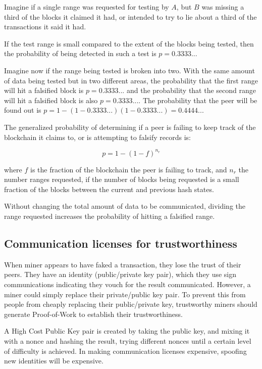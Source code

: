 \documentclass[a4paper,12pt]{article}
\begin{document}
Imagine if a single range was requested for testing by $A$, but $B$ was missing a third of the blocks it claimed it had, or intended to try to lie about a third of the transactions it said it had. 


If the test range is small compared to the extent of the blocks being tested, then the probability of being detected in such a test is $p=0.3333...$

Imagine now if the range being tested is broken into two. With the same amount of data being tested but in two different areas, the probability that the first range will hit a falsified block is $p=0.3333...$ and the probability that the second range will hit a falsified block is also $p=0.3333...$. The probability that the peer will be found out is $p = 1-(1-0.3333...)(1-0.3333...) = 0.4444...$


The generalized probability of determining if a peer is failing to keep track of the blockchain it claims to, or is attempting to falsify records is:

\[p = 1 - (1-f)^{n_r}\]

where $f$ is the fraction of the blockchain the peer is failing to track, and $n_r$ the number ranges requested, if the number of blocks being requested is a small fraction of the blocks between the current and previous hash states. 

Without changing the total amount of data to be communicated, dividing the range requested increases the probability of hitting a falsified range. 


\subsection{Communication licenses for trustworthiness}
When miner appears to have faked a transaction, they lose the trust of their peers. They have an identity (public/private key pair), which they use sign communications indicating they vouch for the result communicated. However, a miner could simply replace their private/public key pair. To prevent this from people from cheaply replacing their public/private key, trustworthy miners should generate Proof-of-Work to establish their trustworthiness. 

A High Cost Public Key pair is created by taking the public key, and mixing it with a nonce and hashing the result, trying different nonces until a certain level of difficulty is achieved. In making communication licenses expensive, spoofing new identities will be expensive. 
\end{document}
